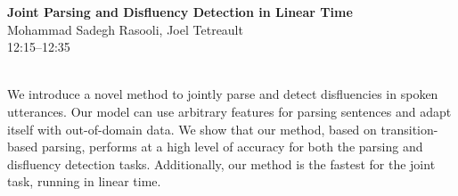 \documentclass[twoside,makeidx]{book}
\begin{document}
\par\vspace{2em}\noindent%
\begin{minipage}{\linewidth}%
\begin{center}
\textbf{\normalsize Joint Parsing and Disfluency Detection in Linear Time}\\
\normalsize  Mohammad Sadegh Rasooli,  Joel Tetreault\\
{\small 12:15--12:35}\\
\end{center}
\end{minipage}\\[0.5em]
\nopagebreak%
\noindent%
{\small We introduce a novel method to jointly parse and detect disfluencies in spoken utterances.  Our model can use arbitrary features for parsing sentences and adapt itself with out-of-domain data.  We show that our method, based on transition-based parsing, performs at a high level of accuracy for both the parsing and disfluency detection tasks.  Additionally, our method is the fastest for the joint task, running in linear time.}
\clearpage
\end{document}
